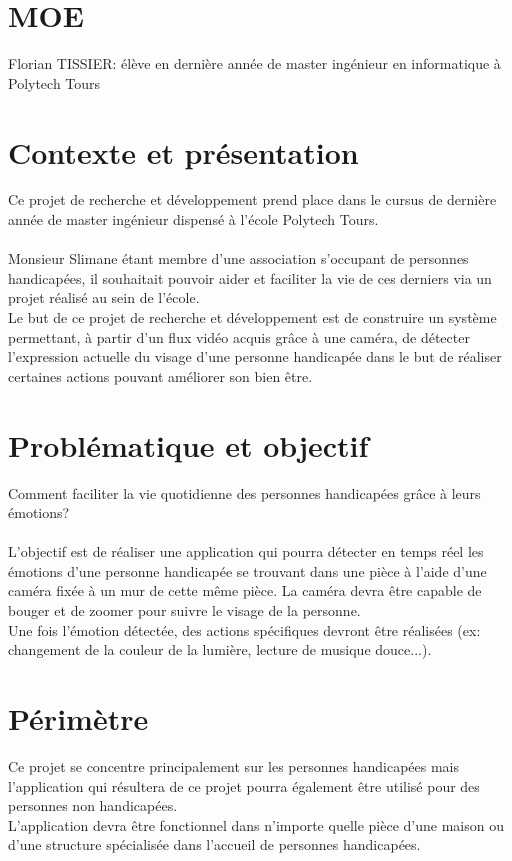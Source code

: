 \documentclass[poster]{polytech/polytech}
\begin{document}
\section{MOE}
Florian TISSIER: élève en dernière année de master ingénieur en informatique à Polytech Tours

\section{Contexte et présentation}
Ce projet de recherche et développement prend place dans le cursus de dernière année de master ingénieur dispensé à l'école Polytech Tours.\\
\\
Monsieur Slimane étant membre d'une association s'occupant de personnes handicapées, il souhaitait pouvoir aider et faciliter la vie de ces derniers via un projet réalisé au sein de l'école.\\
Le but de ce projet de recherche et développement est de construire un système permettant, à partir d'un flux vidéo acquis grâce à une caméra, de détecter l'expression actuelle du visage d'une personne handicapée dans le but de réaliser certaines actions pouvant améliorer son bien être.

\section{Problématique et objectif}
Comment faciliter la vie quotidienne des personnes handicapées grâce à leurs émotions?\\
\\
L'objectif est de réaliser une application qui pourra détecter en temps réel les émotions d'une personne handicapée se trouvant dans une pièce à l'aide d'une caméra fixée à un mur de cette même pièce. La caméra devra être capable de bouger et de zoomer pour suivre le visage de la personne.\\
Une fois l'émotion détectée, des actions spécifiques devront être réalisées (ex: changement de la couleur de la lumière, lecture de musique douce...).

\section{Périmètre}
Ce projet se concentre principalement sur les personnes handicapées mais l'application qui résultera de ce projet pourra également être utilisé pour des personnes non handicapées.\\
L'application devra être fonctionnel dans n'importe quelle pièce d'une maison ou d'une structure spécialisée dans l'accueil de personnes handicapées.
\end{document}
